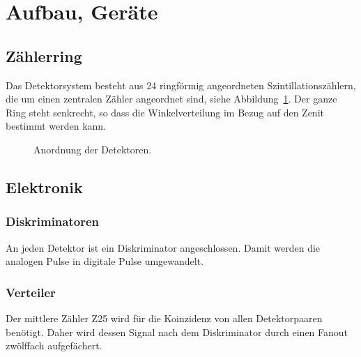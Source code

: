\documentclass[11pt, ngerman, fleqn, DIV=15, headinclude, BCOR=2cm]{scrreprt}
\begin{document}
\section{Aufbau, Geräte}

\subsection{Zählerring}

Das Detektorsystem besteht aus 24 ringförmig angeordneten
Szintillationszählern, die um einen zentralen Zähler angeordnet sind, siehe
Abbildung~\ref{fig:detektoren}. Der ganze Ring steht senkrecht, so dass die
Winkelverteilung im Bezug auf den Zenit bestimmt werden kann.

\begin{figure}[htbp]
    \centering
    \caption{%
        Anordnung der Detektoren.
    }
    \label{fig:detektoren}
\end{figure}

\subsection{Elektronik}

\subsubsection{Diskriminatoren}

An jeden Detektor ist ein Diskriminator angeschlossen. Damit werden die
analogen Pulse in digitale Pulse umgewandelt.

\subsubsection{Verteiler}

Der mittlere Zähler Z25 wird für die Koinzidenz von allen Detektorpaaren
benötigt. Daher wird dessen Signal nach dem Diskriminator durch einen Fanout
zwölffach aufgefächert.
\end{document}
